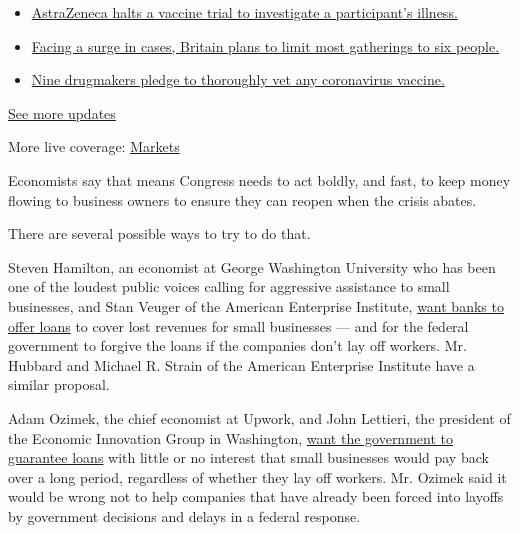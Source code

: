 \begin{itemize}
\tightlist
\item
  \href{https://www.nytimes3xbfgragh.onion/2020/09/08/world/covid-19-coronavirus.html?action=click\&pgtype=Article\&state=default\&region=MAIN_CONTENT_1\&context=storylines_live_updates\#link-313b443d}{AstraZeneca
  halts a vaccine trial to investigate a participant's illness.}
\item
  \href{https://www.nytimes3xbfgragh.onion/2020/09/08/world/covid-19-coronavirus.html?action=click\&pgtype=Article\&state=default\&region=MAIN_CONTENT_1\&context=storylines_live_updates\#link-4438dd7}{Facing
  a surge in cases, Britain plans to limit most gatherings to six
  people.}
\item
  \href{https://www.nytimes3xbfgragh.onion/2020/09/08/world/covid-19-coronavirus.html?action=click\&pgtype=Article\&state=default\&region=MAIN_CONTENT_1\&context=storylines_live_updates\#link-679303d7}{Nine
  drugmakers pledge to thoroughly vet any coronavirus vaccine.}
\end{itemize}

\href{https://www.nytimes3xbfgragh.onion/2020/09/08/world/covid-19-coronavirus.html?action=click\&pgtype=Article\&state=default\&region=MAIN_CONTENT_1\&context=storylines_live_updates}{See
more updates}

More live coverage:
\href{https://www.nytimes3xbfgragh.onion/live/2020/09/08/business/stock-market-today-coronavirus?action=click\&pgtype=Article\&state=default\&region=MAIN_CONTENT_1\&context=storylines_live_updates}{Markets}

Economists say that means Congress needs to act boldly, and fast, to
keep money flowing to business owners to ensure they can reopen when the
crisis abates.

There are several possible ways to try to do that.

Steven Hamilton, an economist at George Washington University who has
been one of the loudest public voices calling for aggressive assistance
to small businesses, and Stan Veuger of the American Enterprise
Institute,
\href{https://thedispatch.com/p/any-stimulus-plan-must-help-small}{want
banks to offer loans} to cover lost revenues for small businesses ---
and for the federal government to forgive the loans if the companies
don't lay off workers. Mr. Hubbard and Michael R. Strain of the American
Enterprise Institute have a similar proposal.

Adam Ozimek, the chief economist at Upwork, and John Lettieri, the
president of the Economic Innovation Group in Washington,
\href{https://eig.org/news/main-street-rescue-and-resiliency-program}{want
the government to guarantee loans} with little or no interest that small
businesses would pay back over a long period, regardless of whether they
lay off workers. Mr. Ozimek said it would be wrong not to help companies
that have already been forced into layoffs by government decisions and
delays in a federal response.

